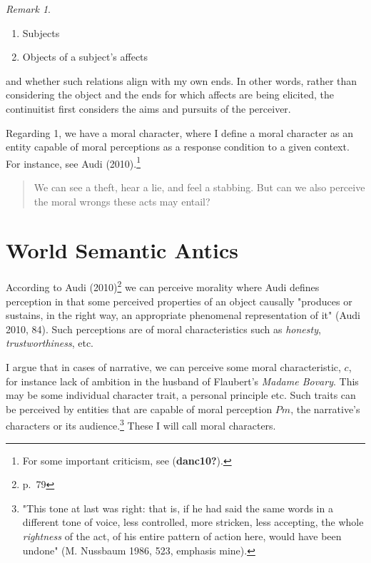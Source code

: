 \documentclass[12pt]{book}
\theoremstyle{definition}
\theoremstyle{remark}
\newtheorem{remark}[theorem]{Remark}
\providecommand{\tightlist}{%
  \setlength{\itemsep}{0pt}\setlength{\parskip}{0pt}}
\begin{document}
\begin{remark}
\leavevmode

\begin{enumerate}
\def\labelenumi{\arabic{enumi}.}
\tightlist
\item
  Subjects
\item
  Objects of a subject's affects
\end{enumerate}

\end{remark}

\noindent and whether such relations align with my own ends. In other words, rather than considering the object and the ends for which affects are being elicited, the continuitist first considers the aims and pursuits of the perceiver.

Regarding 1, we have a moral character, where I define a moral character as an entity capable of moral perceptions as a response condition to a given context. For instance, see Audi (2010).\footnote{For some important criticism, see (\textbf{danc10?}).}

\begin{quote}
We can see a theft, hear a lie, and feel a stabbing. But can we also perceive the moral wrongs these acts may entail?
\end{quote}

\section{World Semantic Antics}\label{world-semantic-antics}

According to Audi (2010)\footnote{p.~79} we can perceive morality where Audi defines perception in that some perceived properties of an object causally "produces or sustains, in the right way, an appropriate phenomenal representation of it" (Audi 2010, 84). Such perceptions are of moral characteristics such as \emph{honesty}, \emph{trustworthiness}, etc.

I argue that in cases of narrative, we can perceive some moral characteristic, \(c\), for instance lack of ambition in the husband of Flaubert's \emph{Madame Bovary}. This may be some individual character trait, a personal principle etc. Such traits can be perceived by entities that are capable of moral perception \(Pm\), the narrative's characters or its audience.\footnote{"\textquotesingle This tone at last was right\textquotesingle: that is, if he had said the same words in a different tone of voice, less controlled, more stricken, less accepting, the whole \emph{rightness} of the act, of his entire pattern of action here, would have been undone" (M. Nussbaum 1986, 523, emphasis mine).} These I will call moral characters.
\end{document}
